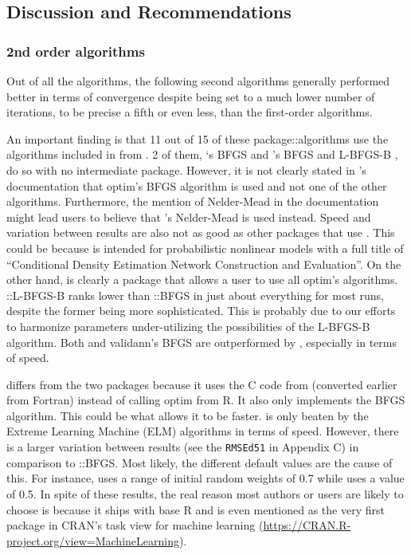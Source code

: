 \hypertarget{discussion-and-recommendations}{%
\subsection{Discussion and
Recommendations}\label{discussion-and-recommendations}}

\hypertarget{nd-order-algorithms}{%
\subsubsection{2nd order algorithms}\label{nd-order-algorithms}}

Out of all the algorithms, the following second algorithms generally
performed better in terms of convergence despite being set to a much
lower number of iterations, to be precise a fifth or even less, than the
first-order algorithms.

An important finding is that 11 out of 15 of these package::algorithms
use the algorithms included in  from . 2 of
them, `s BFGS \citep{R-CaDENCE} and
's BFGS and L-BFGS-B \citep{R-validann}, do so with no
intermediate package. However, it is not clearly stated in
's documentation that optim's BFGS algorithm is used
and not one of the other algorithms. Furthermore, the mention of
Nelder-Mead in the documentation might lead users to believe that
's Nelder-Mead is used instead. Speed and variation between
results are also not as good as other packages that use .
This could be because  is intended for probabilistic
nonlinear models with a full title of ``Conditional Density Estimation
Network Construction and Evaluation''. On the other hand,
 is clearly a package that allows a user to use all
optim's algorithms. ::L-BFGS-B ranks lower than
::BFGS in just about everything for most runs, despite
the former being more sophisticated. This is probably due to our efforts
to harmonize parameters under-utilizing the possibilities of the
L-BFGS-B algorithm. Both  and validann's BFGS are
outperformed by , especially in terms of speed.

 \citep{R-nnet} differs from the two packages because it
uses the C code from  (converted earlier from Fortran)
instead of calling optim from R. It also only implements the BFGS
algorithm. This could be what allows it to be faster.  is
only beaten by the Extreme Learning Machine (ELM) algorithms in terms of
speed. However, there is a larger variation between results (see the
\texttt{RMSEd51} in Appendix C) in comparison to
::BFGS. Most likely, the different default values are
the cause of this. For instance,  uses a range of initial
random weights of 0.7 while  uses a value of 0.5. In
spite of these results, the real reason most authors or users are likely
to choose  is because it ships with base R and is even
mentioned as the very first package in CRAN's task view for machine
learning (\url{https://CRAN.R-project.org/view=MachineLearning}).

